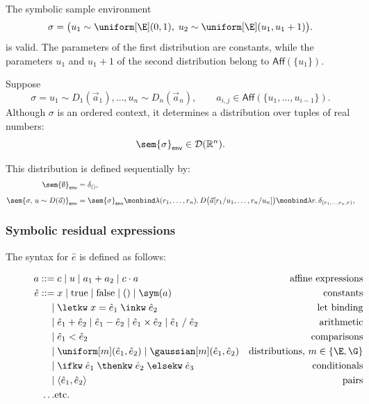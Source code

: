 \begin{example}
  The symbolic sample environment
  \[
    \sigma
    =
    \bigl(
      u_1 \sim \uniform[\E](0,1),\;
      u_2 \sim \uniform[\E](u_1,u_1+1)
    \bigr).
  \]
  is valid.
  The parameters of the first distribution are constants, while the parameters
  $u_1$ and $u_1+1$ of the second distribution belong to
  $\mathsf{Aff}(\{u_1\})$. 
\end{example}

Suppose
\[
  \sigma =
  u_1 \sim D_1(\vec a_1),\ldots,
  u_n \sim D_n(\vec a_n),
  \qquad
  a_{i,j} \in \mathsf{Aff}(\{u_1,\ldots,u_{i-1}\}).
\]
Although $\sigma$ is an ordered context, it determines a distribution over
tuples of real numbers:
\[
  \sem{\sigma}_{\mathsf{env}} \in \mathcal{D}(\mathbb{R}^n).
\]

This distribution is defined sequentially by:
\[
\begin{aligned}
  \sem{\emptyset}_{\mathsf{env}}
  &= \delta_{()}, \\[0.5em]
  \sem{\sigma,\,u \sim D(\vec a)}_{\mathsf{env}}
  &=
  \sem{\sigma}_{\mathsf{env}}
  \monbind
  \lambda (r_1,\ldots,r_n).\,
  D\bigl(\vec a[r_1/u_1,\ldots,r_n/u_n]\bigr)
  \monbind
  \lambda r.\,
  \delta_{(r_1,\ldots,r_n,r)},
\end{aligned}
\]

\subsubsection{Symbolic residual expressions}


The syntax for $\hat{e}$ is defined as follows:
\begin{figure}[h]
	\begin{align*}
    a ::= &\; c \mid u \mid a_1 + a_2 \mid c \cdot a & \text{affine expressions} \\
		\hat e ::= &\; x \mid \text{true} \mid \text{false} \mid () \mid \sym(a) & \text{constants} \\
		| &\; \letkw \; x = \hat e_1\; \inkw \; \hat e_2  & \text{let binding} \\
	    | &\; \hat e_1 + \hat e_2 \mid  \hat e_1 - \hat e_2 \mid \hat e_1 \times \hat e_2 \mid \hat e_1\; /\; \hat e_2 & \text{arithmetic} \\
	    | &\; \hat e_1 < \hat e_2  & \text{comparisons} \\
      | &\; \uniform[m](\hat e_1,\hat e_2) \mid \gaussian[m](\hat e_1,\hat e_2) & \text{distributions, } m \in \{\E,\G\} \\
	    | &\; \ifkw\; \hat e_1\; \thenkw\; \hat e_2\; \elsekw\; \hat e_3 & \text{conditionals} \\
    | &\; \langle \hat e_1,\hat e_2\rangle & \text{pairs} \\
    \ldots & \text{etc.}
	\end{align*}
\label{fig:grammar}
\end{figure}

